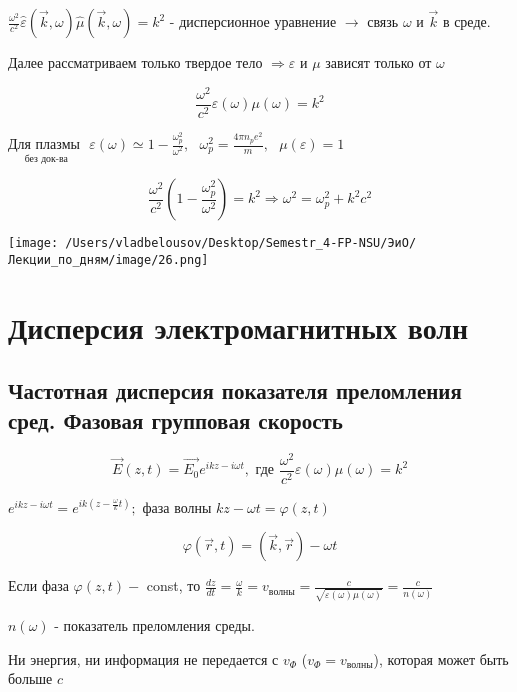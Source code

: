 \documentclass[12pt, a4paper]{report}
\begin{document}
\( \displaystyle \frac{\omega ^2 }{c ^2 }\hat{\varepsilon}  (\vec{k } , \omega )\hat{\mu} ( \vec{k } , \omega)= k ^2 \)    - дисперсионное уравнение \( \to       \)   связь \( \omega   \) и \( \vec{k }  \) в среде.

Далее рассматриваем только твердое тело \( \Rightarrow  \varepsilon  \) и \( \mu     \)  зависят только от \( \omega \) 

\[ \frac{\omega ^2 }{c ^2 } \varepsilon( \omega ) \mu ( \omega) = k ^2   \] 

\( \underset{\text{без док-ва} }{\text{Для плазмы } } \)  \( \displaystyle \varepsilon ( \omega ) \simeq 1- \frac{\omega _p ^2 }{\omega ^2 } , \text{ } \omega _ p ^2 = \frac{4 \pi n_p e ^2 }{m } , \text{ } \mu ( \varepsilon ) = 1    \) 

\[ \frac{\omega ^2 }{c ^2 } \left(  1 - \frac{\omega _p ^2}{\omega ^2 }  \right) =k ^2 \Rightarrow \omega ^2 = \omega_p ^2  + k ^2 c ^2   \] 

\begin{center}
    \texttt{[image: /Users/vladbelousov/Desktop/Semestr\_4-FP-NSU/ЭиО/Лекции\_по\_дням/image/26.png]}
\end{center}

\chapter{Дисперсия электромагнитных волн}

\section{Частотная дисперсия показателя преломления сред. Фазовая групповая скорость}

\[ \vec{E } (z,t ) = \vec{E_0 }e^{ikz - i \omega t }  , \text{ где } \frac{\omega ^2 }{c ^2 }\varepsilon ( \omega )\mu( \omega ) =k ^2    \] 

\( e^{ikz - i \omega t }=e^{ik(z- \frac{\omega}{k } t  )} ;   \) фаза волны \( kz - \omega t = \varphi( z, t ) \) 

\[ \varphi ( \vec{r } , t ) = ( \vec{k }  , \vec{r }  ) - \omega t  \] 

Если фаза \(\displaystyle  \varphi( z , t ) -  \) const, то  \( \displaystyle \frac{dz}{dt } = \frac{\omega}{k } = v_{\text{волны} } = \frac{c}{\sqrt{\varepsilon (\omega ) \mu ( \omega)}} =\frac{c}{ n ( \omega)}   \)

\( n ( \omega ) \) - показатель преломления среды. 

Ни энергия, ни информация не передается с \( v_{\Phi  }  \) (\( v_{\Phi  }  =v_{\text{волны} } \)), которая может быть больше \( c \) 
\end{document}
